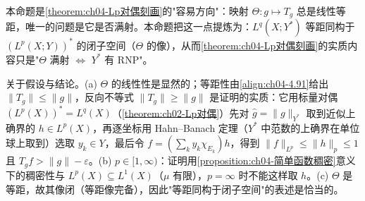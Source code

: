 \documentclass[../../main.tex]{subfiles}%
\begin{document}
\begin{remark}\label{remark:ch04-对偶等距嵌入}
本命题是\cref{theorem:ch04-Lp对偶刻画}的"容易方向"：映射 $\Theta:g\mapsto T_g$ 总是线性等距，唯一的问题是它是否满射。本命题把这一点提炼为：$L^q(X;Y^*)$ 等距同构于 $(L^p(X;Y))^*$ 的闭子空间（$\Theta$ 的像），从而\cref{theorem:ch04-Lp对偶刻画}的实质内容只是"$\Theta$ 满射 $\Leftrightarrow$ $Y^*$ 有 RNP"。

关于假设与结论。(a) $\Theta$ 的线性性是显然的；等距性由\eqref{align:ch04-4.91}给出 $\|T_g\|\leqslant\|g\|$，反向不等式 $\|T_g\|\geqslant\|g\|$ 是证明的实质：它用标量对偶 $(L^p(X))^*=L^q(X)$（\cref{theorem:ch02-Lp对偶}）先对 $\hat g=\|g\|_{Y^*}$ 取到近似上确界的 $h\in L^p(X)$，再逐坐标用 Hahn--Banach 定理（$Y^*$ 中范数的上确界在单位球上取到）选取 $y_k\in Y$，最后令 $f=(\sum_ky_k\chi_{E_k})h$，得到 $\|f\|_{L^p}\leqslant\|h\|_p\leqslant1$ 且 $T_gf>\|g\|-\varepsilon$。(b) $p\in[1,\infty)$：证明用\cref{proposition:ch04-简单函数稠密}意义下的稠密性与 $L^p(X)\subseteq L^1(X)$（$\mu$ 有限），$p=\infty$ 时不能这样取 $h$。(c) $\Theta$ 是等距，故其像闭（等距像完备），因此"等距同构于闭子空间"的表述是恰当的。
\end{remark}
\end{document}
